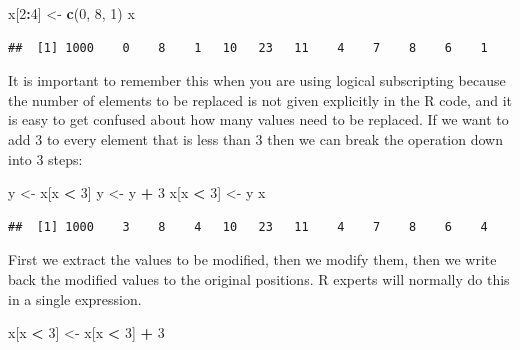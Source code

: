 \documentclass[
]{book}
\newenvironment{Shaded}{\begin{snugshade}}{\end{snugshade}}
\newcommand{\DecValTok}[1]{\textcolor[rgb]{0.00,0.00,0.81}{#1}}
\newcommand{\FunctionTok}[1]{\textcolor[rgb]{0.13,0.29,0.53}{\textbf{#1}}}
\newcommand{\NormalTok}[1]{#1}
\newcommand{\OtherTok}[1]{\textcolor[rgb]{0.56,0.35,0.01}{#1}}
\newcommand{\SpecialCharTok}[1]{\textcolor[rgb]{0.81,0.36,0.00}{\textbf{#1}}}
\begin{document}
\begin{Shaded}
\begin{Highlighting}[]
\NormalTok{x[}\DecValTok{2}\SpecialCharTok{:}\DecValTok{4}\NormalTok{] }\OtherTok{\textless{}{-}} \FunctionTok{c}\NormalTok{(}\DecValTok{0}\NormalTok{, }\DecValTok{8}\NormalTok{, }\DecValTok{1}\NormalTok{)}
\NormalTok{x}
\end{Highlighting}
\end{Shaded}

\begin{verbatim}
##  [1] 1000    0    8    1   10   23   11    4    7    8    6    1
\end{verbatim}

It is important to remember this when you are using logical
subscripting because the number of elements to be replaced is not
given explicitly in the R code, and it is easy to get confused about
how many values need to be replaced. If we want to add 3 to every
element that is less than 3 then we can break the operation down into
3 steps:

\begin{Shaded}
\begin{Highlighting}[]
\NormalTok{y }\OtherTok{\textless{}{-}}\NormalTok{ x[x }\SpecialCharTok{\textless{}} \DecValTok{3}\NormalTok{]}
\NormalTok{y }\OtherTok{\textless{}{-}}\NormalTok{ y }\SpecialCharTok{+} \DecValTok{3}
\NormalTok{x[x }\SpecialCharTok{\textless{}} \DecValTok{3}\NormalTok{] }\OtherTok{\textless{}{-}}\NormalTok{ y}
\NormalTok{x}
\end{Highlighting}
\end{Shaded}

\begin{verbatim}
##  [1] 1000    3    8    4   10   23   11    4    7    8    6    4
\end{verbatim}

First we extract the values to be modified, then we modify them, then we
write back the modified values to the original positions. R experts will
normally do this in a single expression.

\begin{Shaded}
\begin{Highlighting}[]
\NormalTok{x[x }\SpecialCharTok{\textless{}} \DecValTok{3}\NormalTok{] }\OtherTok{\textless{}{-}}\NormalTok{ x[x }\SpecialCharTok{\textless{}} \DecValTok{3}\NormalTok{] }\SpecialCharTok{+} \DecValTok{3}
\end{Highlighting}
\end{Shaded}
\end{document}
